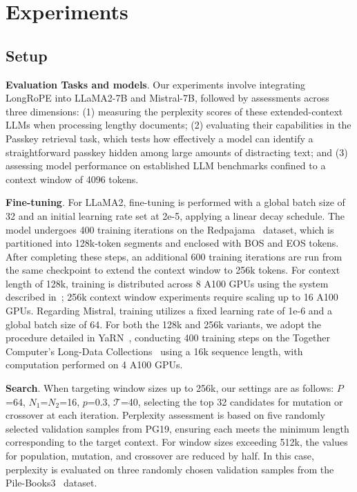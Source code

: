 \section{Experiments}

\label{sec:exp}
\subsection{Setup}
\textbf{Evaluation Tasks and models}. Our experiments involve integrating LongRoPE into LLaMA2-7B and Mistral-7B, followed by assessments across three dimensions: (1) measuring the perplexity scores of these extended-context LLMs when processing lengthy documents; (2) evaluating their capabilities in the Passkey retrieval task, which tests how effectively a model can identify a straightforward passkey hidden among large amounts of distracting text; and (3) assessing model performance on established LLM benchmarks confined to a context window of 4096 tokens.

\textbf{Fine-tuning}. For LLaMA2, fine-tuning is performed with a global batch size of 32 and an initial learning rate set at 2e-5, applying a linear decay schedule. The model undergoes 400 training iterations on the Redpajama~\cite{redpajama} dataset, which is partitioned into 128k-token segments and enclosed with BOS and EOS tokens. After completing these steps, an additional 600 training iterations are run from the same checkpoint to extend the context window to 256k tokens. For context length of 128k, training is distributed across 8 A100 GPUs using the system described in~\cite{cube}; 256k context window experiments require scaling up to 16 A100 GPUs. Regarding Mistral, training utilizes a fixed learning rate of 1e-6 and a global batch size of 64. For both the 128k and 256k variants, we adopt the procedure detailed in YaRN~\cite{yarn}, conducting 400 training steps on the Together Computer's Long-Data Collections~\cite{mistraldata} using a 16k sequence length, with computation performed on 4 A100 GPUs.

\textbf{Search}. When targeting window sizes up to 256k, our settings are as follows: $P$=64, $N_1$=$N_2$=16, $p$=0.3, $\mathcal{T}$=40, selecting the top 32 candidates for mutation or crossover at each iteration. Perplexity assessment is based on five randomly selected validation samples from PG19, ensuring each meets the minimum length corresponding to the target context. For window sizes exceeding 512k, the values for population, mutation, and crossover are reduced by half. In this case, perplexity is evaluated on three randomly chosen validation samples from the Pile-Books3~\cite{pile} dataset.


